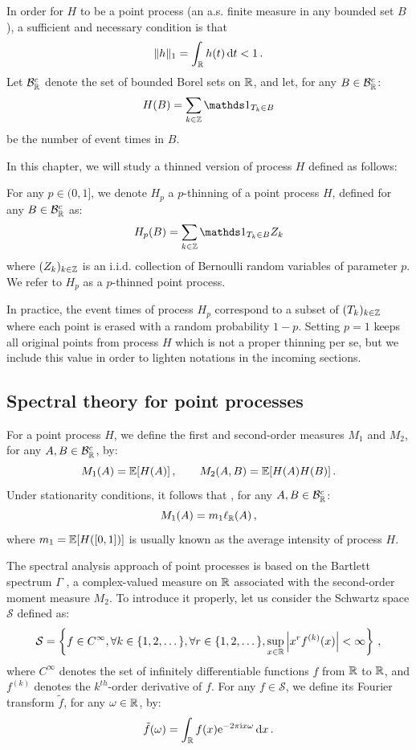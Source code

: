 In order for $H$ to be a point process (\ie an a.s. finite measure in any bounded set $B$), 
a sufficient and necessary condition \parencite{Hawkes1971} is that 
\[\|h\|_1 = \int_{{\mathbb R}}{h(t)\,{\mathrm{d}} t} < 1\,.\]
Let $\mathcal{B}_{{\mathbb R}}^c$ denote the set of bounded Borel sets on ${\mathbb R}$, and let, for any $B\in\mathcal{B}_{{\mathbb R}}^c$:
\[H(B) = \sum_{k\in\ZZ}{\II_{T_k \in B}}\]
be the number of event times in $B$. 

In this chapter, we will study a thinned version of process $H$ defined as follows:
\begin{definition}\label{def:chap5_thinning}
For any $p\in(0,1]$, we denote $H_p$ a $p$-thinning of a point process $H$, defined for any $B\in\mathcal{B}_{{\mathbb R}}^c$ as:
\[H_p(B) = \sum_{k\in\ZZ}{\II_{T_k \in B} Z_k}\]
where $(Z_k)_{k\in{\mathbb Z}}$ is an i.i.d. collection of Bernoulli random variables of parameter $p$.
We refer to $H_p$ as a $p$-thinned point process.
\end{definition}

In practice, the event times of process $H_p$ correspond to a subset of $(T_k)_{k\in{\mathbb Z}}$ where each point
is erased with a random probability $1-p$. 
Setting $p = 1$ keeps all original points from process $H$ which is not a proper thinning per se,
but we include this value in order to lighten notations in the incoming sections. 

\subsection{Spectral theory for point processes}\label{sec:chap5_spectral_theory}

For a point process $H$, we define the first and second-order measures $M_1$ and $M_2$, for any $A, B\in\mathcal{B}_{{\mathbb R}}^c$, by:
\[M_1(A) = {\mathbb E}[H(A)]\,,\qquad M_2(A,B) = {\mathbb E}[H(A)H(B)]\,.\]
Under stationarity conditions, it follows that \parencite[Proposition 8.1.I]{DaleyV1}, for any $A, B\in\mathcal{B}_{{\mathbb R}}^c$:
\[M_1(A) = m_1 \ell_{{\mathbb R}}(A)\,,\]
where $m_1 = {\mathbb E}[H([0,1])]$ is usually known as the average intensity of process $H$.

The spectral analysis approach of point processes is based on the Bartlett spectrum $\Gamma$ \parencite{Bartlett1963}, 
a complex-valued measure on ${\mathbb R}$ associated with the second-order moment measure $M_2$. 
To introduce it properly, let us consider the Schwartz space $\mathcal{S}$ defined as:
\[
    \mathcal S = \left\{ f \in C^\infty, \forall k \in \{1, 2, \dots\}, \forall r \in \{1, 2, \dots\},
    \sup_{x \in {\mathbb R}} \left| x^r
    f^{(k)}(x)
    \right| < \infty \right\}\,,
\] where $C^\infty$ denotes the set of infinitely differentiable functions $f$ from ${\mathbb R}$ to ${\mathbb R}$, 
and $f^{(k)}$ denotes the $k^{th}$-order derivative of $f$.
For any $f\in\mathcal{S}$, we define its Fourier transform $\tilde f$, for any $\omega\in{\mathbb R}$, by:
\[\tilde f (\omega) = \int_{{\mathbb R}}{f(x) \mathrm{e}^{-2\pi\mathrm{i} x \omega}\,{\mathrm{d}} x}\,.\]


